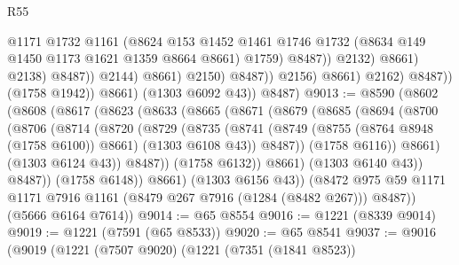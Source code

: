 \begin{lexlean}{R55}
\begin{coremodule}
                                              @1171
                                              @1732
                                              @1161
                                              (@8624
                                                @153
                                                @1452
                                                @1461
                                                @1746
                                                @1732
                                                (@8634 @149 @1450 @1173 @1621 @1359 @8664 @8661)
                                                @1759)
                                              @8487))
                                          @2132)
                                        @8661)
                                      @2138)
                                    @8487))
                                @2144)
                              @8661)
                            @2150)
                          @8487))
                      @2156)
                    @8661)
                  @2162)
                @8487))
            (@1758 @1942))
          @8661)
        (@1303 @6092 @43))
      @8487)
@9013 := @8590
    (@8602
      (@8608
        (@8617
          (@8623
            (@8633
              (@8665
                (@8671
                  (@8679
                    (@8685
                      (@8694
                        (@8700
                          (@8706
                            (@8714
                              (@8720
                                (@8729
                                  (@8735
                                    (@8741
                                      (@8749
                                        (@8755 (@8764 @8948 (@1758 @6100)) @8661)
                                        (@1303 @6108 @43))
                                      @8487))
                                  (@1758 @6116))
                                @8661)
                              (@1303 @6124 @43))
                            @8487))
                        (@1758 @6132))
                      @8661)
                    (@1303 @6140 @43))
                  @8487))
              (@1758 @6148))
            @8661)
          (@1303 @6156 @43))
        (@8472 @975 @59 @1171 @1171 @7916 @1161 (@8479 @267 @7916 (@1284 (@8482 @267))) @8487))
      (@5666 @6164 @7614))
@9014 := @65 @8554
@9016 := @1221 (@8339 @9014)
@9019 := @1221 (@7591 (@65 @8533))
@9020 := @65 @8541
@9037 := @9016
    (@9019
      (@1221
        (@7507 @9020)
        (@1221
          (@7351 (@1841 @8523))

\end{coremodule}
\end{lexlean}
